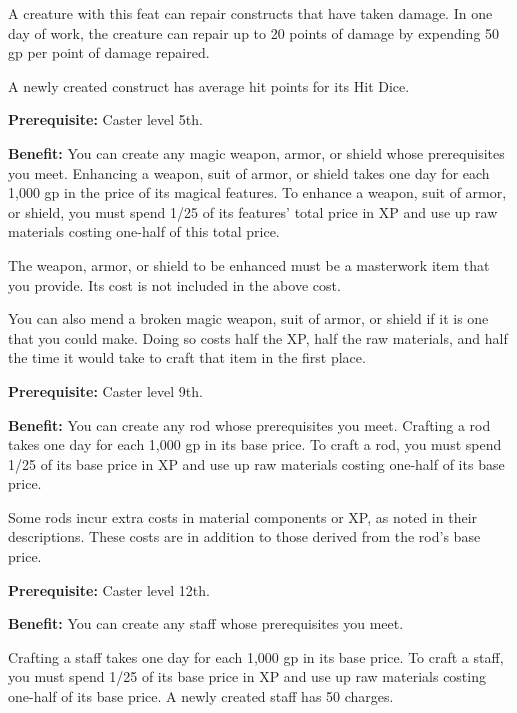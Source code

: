 A creature with this feat can repair constructs that have taken damage. In one 
day of work, the creature can repair up to 20 points of damage by expending 50 
gp per point of damage repaired.

A newly created construct has average hit points for its Hit Dice.


\textbf{Prerequisite:} Caster level 5th.

\textbf{Benefit:} You can create any magic weapon, armor, or shield whose prerequisites 
you meet. Enhancing a weapon, suit of armor, or shield takes one day for each 1,000 
gp in the price of its magical features. To enhance a weapon, suit of armor, or 
shield, you must spend 1/25 of its features' total price in XP and use up raw materials 
costing one-half of this total price.

The weapon, armor, or shield to be enhanced must be a masterwork item that you 
provide. Its cost is not included in the above cost.

You can also mend a broken magic weapon, suit of armor, or shield if it is one 
that you could make. Doing so costs half the XP, half the raw materials, and half 
the time it would take to craft that item in the first place.


\textbf{Prerequisite:} Caster level 9th.

\textbf{Benefit:} You can create any rod whose prerequisites you meet. Crafting 
a rod takes one day for each 1,000 gp in its base price. To craft a rod, you must 
spend 1/25 of its base price in XP and use up raw materials costing one-half of 
its base price.

Some rods incur extra costs in material components or XP, as noted in their descriptions. 
These costs are in addition to those derived from the rod's base price.


\textbf{Prerequisite:} Caster level 12th.

\textbf{Benefit:} You can create any staff whose prerequisites you meet.

Crafting a staff takes one day for each 1,000 gp in its base price. To craft a 
staff, you must spend 1/25 of its base price in XP and use up raw materials costing 
one-half of its base price. A newly created staff has 50 charges.

